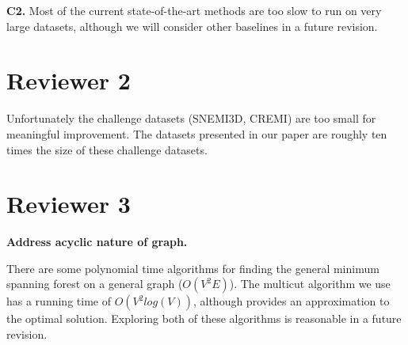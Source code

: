 \documentclass[10pt,twocolumn,letterpaper]{article}
\begin{document}
\textbf{C2.} Most of the current state-of-the-art methods are too slow to run on very large datasets, although we will consider other baselines in a future revision.

\section*{Reviewer 2}

Unfortunately the challenge datasets (SNEMI3D, CREMI) are too small for meaningful improvement. The datasets presented in our paper are roughly ten times the size of these challenge datasets. 

\section*{Reviewer 3}

\textbf{Address acyclic nature of graph.}

There are some polynomial time algorithms for finding the general minimum spanning forest on a general graph ($O(V^2 E)$). The multicut algorithm we use has a running time of $O(V^2 log(V))$, although provides an approximation to the optimal solution. Exploring both of these algorithms is reasonable in a future revision. 

{\small


}
\end{document}
